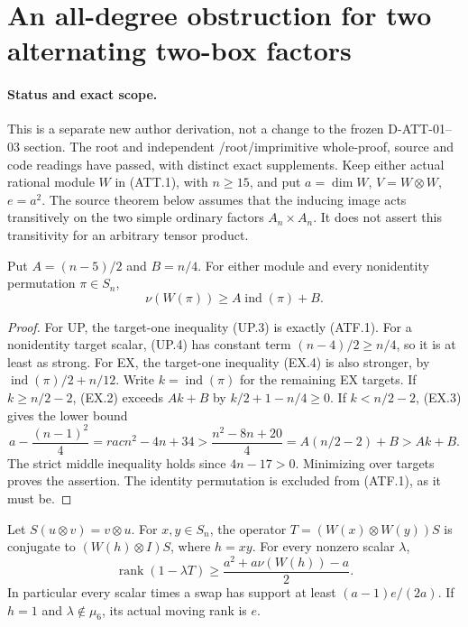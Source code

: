 \section{An all-degree obstruction for two alternating two-box factors}
\label{sec:alternating-two-factor}

\paragraph{Status and exact scope.}
This is a separate new author derivation, not a change to the frozen
D-ATT-01--03 section. The root and independent /root/imprimitive whole-proof, source and
code readings have passed, with distinct exact supplements.
Keep either actual rational module $W$ in (ATT.1), with $n\ge15$,
and put $a=\dim W$, $V=W\otimes W$, $e=a^2$.
The source theorem below assumes that the inducing image acts
transitively on the two simple ordinary factors $A_n\times A_n$.
It does not assert this transitivity for an arbitrary tensor product.

\begin{lemma}
\label{D-ATT-04}
Put $A=(n-5)/2$ and $B=n/4$. For either module and every
nonidentity permutation $\pi\in S_n$,
\[
                 \nu(W(\pi))\ge A\operatorname{ind}(\pi)+B.
                                                               \tag{ATF.1}
\]
\end{lemma}

\begin{proof}
For UP, the target-one inequality (UP.3) is exactly (ATF.1).
For a nonidentity target scalar, (UP.4) has constant term
$(n-4)/2\ge n/4$, so it is at least as strong.
For EX, the target-one inequality (EX.4) is also stronger,
by $\operatorname{ind}(\pi)/2+n/12$.
Write $k=\operatorname{ind}(\pi)$ for the remaining EX targets.
If $k\ge n/2-2$, (EX.2) exceeds $Ak+B$ by
$k/2+1-n/4\ge0$. If $k<n/2-2$, (EX.3) gives the lower bound
\[
 a-\frac{(n-1)^2}{4}=rac{n^2-4n+3}{4}
 >\frac{n^2-8n+20}{4}
   =A(n/2-2)+B>Ak+B.                                      \tag{ATF.2}
\]
The strict middle inequality holds since $4n-17>0$.
Minimizing over targets proves the assertion. The identity
permutation is excluded from (ATF.1), as it must be.
\end{proof}

\begin{lemma}
\label{D-ATT-05}
Let $S(u\otimes v)=v\otimes u$. For $x,y\in S_n$, the
operator $T=(W(x)\otimes W(y))S$ is conjugate to
$(W(h)\otimes I)S$, where $h=xy$. For every nonzero scalar $\lambda$,
\[
 \operatorname{rank}(1-\lambda T)
       \ge\frac{a^2+a\nu(W(h))-a}{2}.                     \tag{ATF.3}
\]
In particular every scalar times a swap has support at least
$(a-1)e/(2a)$. If $h=1$ and $\lambda\notin\mu_6$, its
actual moving rank is $e$.
\end{lemma}

